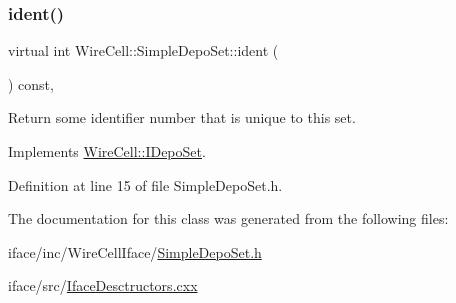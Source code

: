 \mbox{\label{class_wire_cell_1_1_simple_depo_set_a1b5301daed3b2e8981994e7218be1d35}} 
\subsubsection{\texorpdfstring{ident()}{ident()}}
{\footnotesize\ttfamily virtual int Wire\+Cell\+::\+Simple\+Depo\+Set\+::ident (\begin{DoxyParamCaption}{ }\end{DoxyParamCaption}) const\hspace{0.3cm}{\ttfamily [inline]}, {\ttfamily [virtual]}}



Return some identifier number that is unique to this set. 



Implements \hyperlink{class_wire_cell_1_1_i_depo_set_a569837954a71574c7f8675da720d280a}{Wire\+Cell\+::\+I\+Depo\+Set}.



Definition at line 15 of file Simple\+Depo\+Set.\+h.



The documentation for this class was generated from the following files\+:\begin{DoxyCompactItemize}
\item 
iface/inc/\+Wire\+Cell\+Iface/\hyperlink{_simple_depo_set_8h}{Simple\+Depo\+Set.\+h}\item 
iface/src/\hyperlink{_iface_desctructors_8cxx}{Iface\+Desctructors.\+cxx}\end{DoxyCompactItemize}
